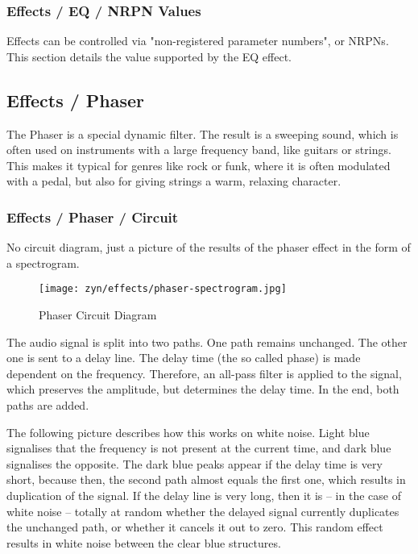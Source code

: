 \subsubsection{Effects / EQ / NRPN Values}
\label{subsubsec:effects_edit_eq_nrpn}

   Effects can be controlled via "non-registered parameter numbers", or NRPNs.
   This section details the value supported by the EQ effect.

\subsection{Effects / Phaser}
\label{subsec:effects_edit_phaser}

   The Phaser is a special dynamic filter. The result is a sweeping sound,
   which is often used on instruments with a large frequency band, like
   guitars or strings. This makes it typical for genres like rock or funk,
   where it is often modulated with a pedal, but also for giving strings a
   warm, relaxing character.

\subsubsection{Effects / Phaser / Circuit}
\label{subsubsec:effects_edit_phaser_circuit}

   No circuit diagram, just a picture of the results of the phaser effect in the
   form of a spectrogram.

\begin{figure}[H]
   \centering 
   \texttt{[image: zyn/effects/phaser-spectrogram.jpg]}
   \caption{Phaser Circuit Diagram}
   \label{fig:phaser_circuit_diagram}
\end{figure}

   The audio signal is split into two paths. One path remains unchanged. The
   other one is sent to a delay line. The delay time (the so called phase) is
   made dependent on the frequency. Therefore, an all-pass filter is applied
   to the signal, which preserves the amplitude, but determines the delay
   time. In the end, both paths are added.

   The following picture describes how this works on white noise. Light blue
   signalises that the frequency is not present at the current time, and dark
   blue signalises the opposite. The dark blue peaks appear if the delay time
   is very short, because then, the second path almost equals the first one,
   which results in duplication of the signal. If the delay line is very
   long, then it is -- in the case of white noise -- totally at random
   whether the delayed signal currently duplicates the unchanged path, or
   whether it cancels it out to zero. This random effect results in white
   noise between the clear blue structures.

